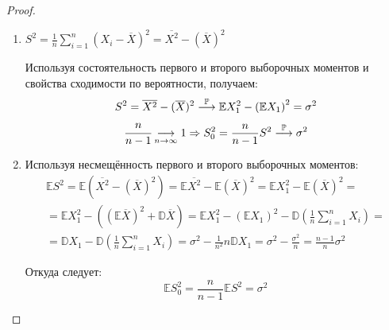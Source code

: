\begin{proof}
\begin{enumerate}
    \item $S^{2}=\frac{1}{n} \sum\limits_{i=1}^{n}\left(X_{i}-\overline{X}\right)^{2}=\overline{X^{2}}-(\overline{X})^{2}$

    Используя состоятельность первого и второго выборочных моментов и свойства сходимости по вероятности, получаем:
    \begin{gather*}
        S^{2}=\overline{X^{2}}-(\overline{X})^{2} \stackrel{\mathbb{P}}{\longrightarrow} \mathbb{E} X_{1}^{2}-\left(\mathbb{E} X_{1}\right)^{2}=\sigma^{2} \\
        \cfrac{n}{n-1} \underset{n \to \infty}{\longrightarrow} 1 \Rightarrow S_{0}^{2}=\frac{n}{n-1} S^{2} %
        \stackrel{\mathbb{P}}{\longrightarrow} \sigma^2
    \end{gather*}
    
    \item Используя несмещённость первого и второго выборочных моментов:
    \begin{multline*}
        \mathbb{E} S^{2} = \mathbb{E}\left(\overline{X^{2}}-(\overline{X})^{2}\right)
        = \mathbb{E} \overline{X^{2}}-\mathbb{E}(\overline{X})^{2}
        = \mathbb{E} X_{1}^{2}-\mathbb{E}(\overline{X})^{2} = \\
        = \mathbb{E} X_{1}^{2}-\left((\mathbb{E} \overline{X})^{2}+\mathbb{D} \overline{X}\right)
        = \mathbb{E} X_{1}^{2}-\left(\mathbb{E} X_{1}\right)^{2}-\mathbb{D}\left(\frac{1}{n} \sum\limits_{i=1}^{n} X_{i}\right) = \\
        = \mathbb{D}X_1 - \mathbb{D}\left(\frac{1}{n} \sum\limits_{i=1}^{n} X_{i}\right)
        = \sigma^{2}-\frac{1}{n^{2}} n \mathbb{D} X_{1}
        = \sigma^{2}-\frac{\sigma^{2}}{n}
        = \frac{n-1}{n} \sigma^{2}
    \end{multline*}
    
    Откуда следует:
    \begin{equation*}
        \mathbb{E} S_{0}^{2}=\frac{n}{n-1} \mathbb{E} S^{2}=\sigma^{2}
    \end{equation*}
    

\end{enumerate}
\end{proof}
